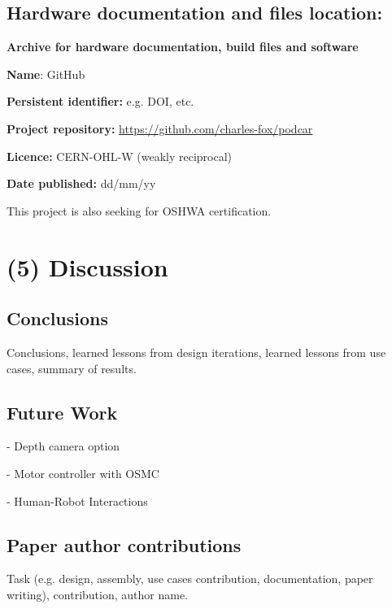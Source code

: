 \documentclass[a4paper]{article}
\begin{document}
\subsection{Hardware documentation and files location:}\label{h.nbisrsde6sc3}

\textbf{Archive for hardware documentation, build files and software}

\textbf{Name}: GitHub

\textbf{Persistent identifier:} e.g. DOI, etc.

\textbf{Project repository:} \url{https://github.com/charles-fox/podcar}

\textbf{Licence:} CERN-OHL-W (weakly reciprocal)

\textbf{Date published:} dd/mm/yy

This project is also seeking for OSHWA certification.


\section{(5) Discussion}\label{h.90jl7wm65t65}

\subsection{Conclusions}\label{h.h3fr33ylzsnh}

Conclusions, learned lessons from design iterations, learned lessons
from use cases, summary of results.


\subsection{Future Work}\label{h.neocsr410zj}


- Depth camera option

- Motor controller with OSMC

- Human-Robot Interactions


\subsection{Paper author contributions}\label{h.fy8hbipy6kwe}

Task (e.g. design, assembly, use cases contribution, documentation,
paper writing), contribution, author name.
\end{document}
